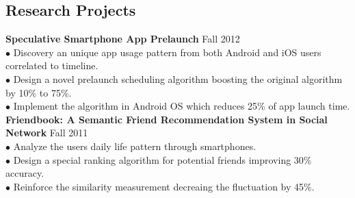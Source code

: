 \documentclass[margin,line]{resume}
\begin{document}
\begin{resume}
    \section{\mysidestyle Research Projects}
	
	\textbf{Speculative Smartphone App Prelaunch} \hfill Fall 2012\\
	$\bullet$ Discovery an unique app usage pattern from both Android and iOS users correlated to timeline.\vspace{0mm}\\%
	$\bullet$ Design a novel prelaunch scheduling algorithm boosting the original algorithm by 10\% to 75\%.\vspace{0mm}\\%
	$\bullet$ Implement the algorithm in Android OS which reduces 25\% of app launch time. \vspace{3mm}\\%
	\textbf{Friendbook: A Semantic Friend Recommendation System in Social Network} \hfill Fall 2011\\
	$\bullet$ Analyze the users daily life pattern through smartphones.  \vspace{0mm}\\%
	$\bullet$ Design a special ranking algorithm for potential friends improving 30\% accuracy. \vspace{0mm}\\%
	$\bullet$ Reinforce the similarity measurement decreaing the fluctuation by 45\%.\vspace{1mm}\\




\end{resume}
\end{document}

